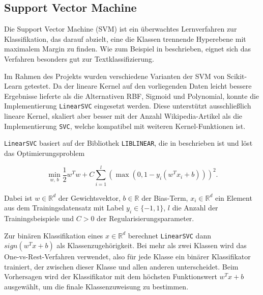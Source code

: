 \subsection{Support Vector Machine}
\label{SVM}

Die Support Vector Machine (SVM) ist ein überwachtes Lernverfahren zur Klassifikation, das darauf abzielt, eine die Klassen trennende Hyperebene mit maximalem Margin zu finden. Wie zum Beispiel in \cite{Joachims1998} beschrieben, eignet sich das Verfahren besonders gut zur Textklassifizierung.

Im Rahmen des Projekts wurden verschiedene Varianten der SVM von Scikit-Learn \cite{Pedregosa2011} getestet. Da der lineare Kernel auf den vorliegenden Daten leicht bessere Ergebnisse lieferte als die Alternativen RBF, Sigmoid und Polynomial, konnte die Implementierung \texttt{LinearSVC} eingesetzt werden. Diese unterstützt ausschließlich lineare Kernel, skaliert aber besser mit der Anzahl Wikipedia-Artikel als die Implementierung \texttt{SVC}, welche kompatibel mit weiteren Kernel-Funktionen ist.

\texttt{LinearSVC} basiert auf der Bibliothek \texttt{LIBLINEAR}, die in \cite{Fan2008} beschrieben ist und löst das Optimierungsproblem

\begin{equation*}
  \min_{w,\, b} \frac{1}{2} w^T w + C \sum_{i=1}^{l} \left( \max(0, 1 - y_i (w^T x_i + b)) \right)^2.
\end{equation*}

Dabei ist \( w \in \mathbb{R}^d \) der Gewichtsvektor, \( b \in \mathbb{R} \) der Bias-Term, \( x_i \in \mathbb{R}^d \) ein Element aus dem Trainingsdatensatz mit Label \( y_i \in \{-1, 1\} \), \( l \) die Anzahl der Trainingsbeispiele und \( C > 0 \) der Regularisierungsparameter.

Zur binären Klassifikation eines \( x \in \mathbb{R}^d \) berechnet \texttt{LinearSVC} dann \( sign(w^T x + b) \) als Klassenzugehörigkeit. Bei mehr als zwei Klassen wird das One-vs-Rest-Verfahren verwendet, also für jede Klasse ein binärer Klassifikator trainiert, der zwischen dieser Klasse und allen anderen unterscheidet. Beim Vorhersagen wird der Klassifikator mit dem höchsten Funktionswert \( w^T x + b \) ausgewählt, um die finale Klassenzuweisung zu bestimmen.

